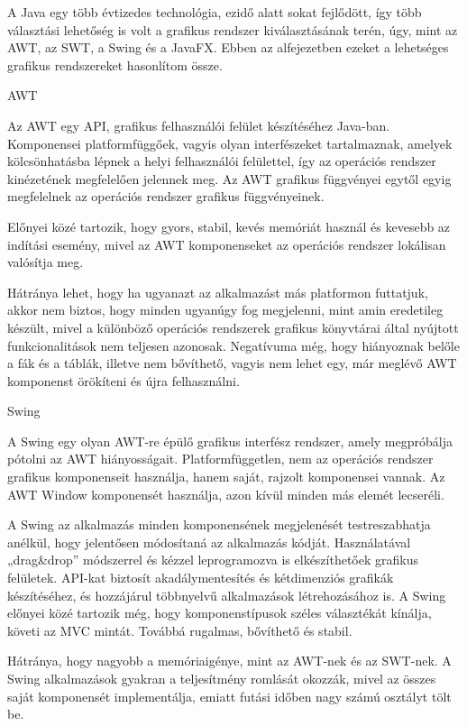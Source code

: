 A Java egy több évtizedes technológia, ezidő alatt sokat fejlődött, így több választási lehetőség is volt a grafikus rendszer kiválasztásának terén, úgy, mint az AWT, az SWT, a Swing és a JavaFX. Ebben az alfejezetben ezeket a lehetséges grafikus rendszereket hasonlítom össze. 

AWT 

Az AWT egy API, grafikus felhasználói felület készítéséhez Java-ban. Komponensei platformfüggőek, vagyis olyan interfészeket tartalmaznak, amelyek kölcsönhatásba lépnek a helyi felhasználói felülettel, így az operációs rendszer kinézetének megfelelően jelennek meg. Az AWT grafikus függvényei egytől egyig megfelelnek az operációs rendszer grafikus függvényeinek. 

Előnyei közé tartozik, hogy gyors, stabil, kevés memóriát használ és kevesebb az indítási esemény, mivel az AWT komponenseket az operációs rendszer lokálisan valósítja meg. 

Hátránya lehet, hogy ha ugyanazt az alkalmazást más platformon futtatjuk, akkor nem biztos, hogy minden ugyanúgy fog megjelenni, mint amin eredetileg készült, mivel a különböző operációs rendszerek grafikus könyvtárai által nyújtott funkcionalitások nem teljesen azonosak. Negatívuma még, hogy hiányoznak belőle a fák és a táblák, illetve nem bővíthető, vagyis nem lehet egy, már meglévő AWT komponenst örökíteni és újra felhasználni. 

Swing 

A Swing egy olyan AWT-re épülő grafikus interfész rendszer, amely megpróbálja pótolni az AWT hiányosságait. Platformfüggetlen, nem az operációs rendszer grafikus komponenseit használja, hanem saját, rajzolt komponensei vannak. Az AWT Window komponensét használja, azon kívül minden más elemét lecseréli. 

A Swing az alkalmazás minden komponensének megjelenését testreszabhatja anélkül, hogy jelentősen módosítaná az alkalmazás kódját. Használatával „drag&drop” módszerrel és kézzel leprogramozva is elkészíthetőek grafikus felületek. API-kat biztosít akadálymentesítés és kétdimenziós grafikák készítéséhez, és hozzájárul többnyelvű alkalmazások létrehozásához is. A Swing előnyei közé tartozik még, hogy komponenstípusok széles választékát kínálja, követi az MVC mintát. Továbbá rugalmas, bővíthető és stabil. 

Hátránya, hogy nagyobb a memóriaigénye, mint az AWT-nek és az SWT-nek. A Swing alkalmazások gyakran a teljesítmény romlását okozzák, mivel az összes saját komponensét implementálja, emiatt futási időben nagy számú osztályt tölt be. 

